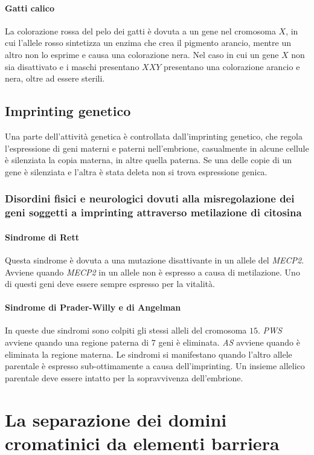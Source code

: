 \paragraph{Gatti calico}
La colorazione rossa del pelo dei gatti \`e dovuta a un gene nel cromosoma $X$, in cui l'allele rosso sintetizza un enzima che crea il pigmento arancio, mentre un altro non lo esprime
e causa una colorazione nera. Nel caso in cui un gene $X$ non sia disattivato e i maschi presentano $XXY$ presentano una colorazione arancio e nera, oltre ad essere sterili. 
\subsection{Imprinting genetico}
Una parte dell'attivit\`a genetica \`e controllata dall'imprinting genetico, che regola l'espressione di geni materni e paterni nell'embrione, casualmente in alcune cellule \`e 
silenziata la copia materna, in altre quella paterna. Se una delle copie di un gene \`e silenziata e l'altra \`e stata deleta non si trova espressione genica. 
\subsubsection{Disordini fisici e neurologici dovuti alla misregolazione dei geni soggetti a imprinting attraverso metilazione di citosina}
\paragraph{Sindrome di Rett}
Questa sindrome \`e dovuta a una mutazione disattivante in un allele del \emph{MECP2}. Avviene quando \emph{MECP2} in un allele non \`e espresso a causa di metilazione. Uno di questi
geni deve essere sempre espresso per la vitalit\`a.
\paragraph{Sindrome di Prader-Willy e di Angelman}
In queste due sindromi sono colpiti gli stessi alleli del cromosoma $15$. \emph{PWS} avviene quando una regione paterna di $7$ geni \`e eliminata. \emph{AS} avviene quando \`e eliminata
la regione materna. Le sindromi si manifestano quando l'altro allele parentale \`e espresso sub-ottimamente a causa dell'imprinting. Un insieme allelico parentale deve essere intatto 
per la sopravvivenza dell'embrione. 
\section{La separazione dei domini cromatinici da elementi barriera}
